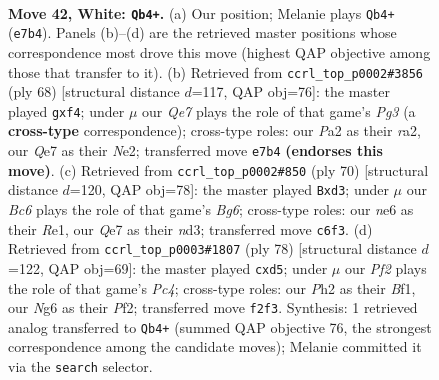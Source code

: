 \documentclass[11pt]{article}
\begin{document}
\clearpage

\begin{figure}[p]\centering
\begin{subfigure}{0.46\textwidth}\centering
\resizebox{\linewidth}{!}{%
\newchessgame
\chessboard[
  setfen={r7/1p2Q1p1/pkB1npN1/8/3R3p/4P1P1/PPR2P1P/7K w - - 3 42},
  showmover=false,
  pgfstyle=straightmove, color=movearrow, markmove={e7-b4}
]}
\caption{}
\end{subfigure}\hfill
\begin{subfigure}{0.46\textwidth}\centering
\resizebox{\linewidth}{!}{%
\newchessgame
\chessboard[
  setfen={7b/1r2pk1p/2Rpn2P/4Pp2/3P1p2/3RB1P1/r3N3/4K3 w - - 0 35},
  showmover=false,
  pgfstyle=straightmove, color=movearrow, markmove={g3-f4}
]}
\caption{}
\end{subfigure}
\\[4pt]
\begin{subfigure}{0.46\textwidth}\centering
\resizebox{\linewidth}{!}{%
\newchessgame
\chessboard[
  setfen={1q5k/6rp/p3ppB1/P7/bPpN3Q/3n4/5PP1/4R1K1 w - - 8 36},
  showmover=false,
  pgfstyle=straightmove, color=movearrow, markmove={g6-d3}
]}
\caption{}
\end{subfigure}\hfill
\begin{subfigure}{0.46\textwidth}\centering
\resizebox{\linewidth}{!}{%
\newchessgame
\chessboard[
  setfen={r7/2kb3p/1Rpn2p1/3p1p2/r1PP3P/4N1P1/5P1K/1R3B2 w - - 1 40},
  showmover=false,
  pgfstyle=straightmove, color=movearrow, markmove={c4-d5}
]}
\caption{}
\end{subfigure}
\caption{\textbf{Move 42, White: \texttt{Qb4+}.} (a) Our position; Melanie plays \texttt{Qb4+} (\texttt{e7b4}). Panels (b)--(d) are the retrieved master positions whose correspondence most drove this move (highest QAP objective among those that transfer to it). (b) Retrieved from \texttt{ccrl\_top\_p0002\#3856} (ply 68) [structural distance $d$=117, QAP obj=76]: the master played \texttt{gxf4}; under $\mu$ our \emph{Qe7} plays the role of that game's \emph{Pg3} (a \textbf{cross-type} correspondence); cross-type roles: our \emph{P}a2 as their \emph{r}a2, our \emph{Q}e7 as their \emph{N}e2; transferred move \texttt{e7b4} \textbf{(endorses this move)}. (c) Retrieved from \texttt{ccrl\_top\_p0002\#850} (ply 70) [structural distance $d$=120, QAP obj=78]: the master played \texttt{Bxd3}; under $\mu$ our \emph{Bc6} plays the role of that game's \emph{Bg6}; cross-type roles: our \emph{n}e6 as their \emph{R}e1, our \emph{Q}e7 as their \emph{n}d3; transferred move \texttt{c6f3}. (d) Retrieved from \texttt{ccrl\_top\_p0003\#1807} (ply 78) [structural distance $d$=122, QAP obj=69]: the master played \texttt{cxd5}; under $\mu$ our \emph{Pf2} plays the role of that game's \emph{Pc4}; cross-type roles: our \emph{P}h2 as their \emph{B}f1, our \emph{N}g6 as their \emph{P}f2; transferred move \texttt{f2f3}. Synthesis: 1 retrieved analog transferred to \texttt{Qb4+} (summed QAP objective 76, the strongest correspondence among the candidate moves); Melanie committed it via the \texttt{search} selector.}
\label{fig:thought-m82}
\end{figure}
\end{document}
